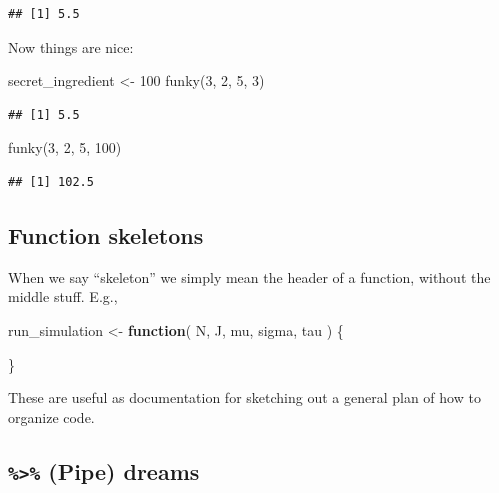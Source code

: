 \documentclass[
]{book}
\newenvironment{Shaded}{\begin{snugshade}}{\end{snugshade}}
\newcommand{\ControlFlowTok}[1]{\textcolor[rgb]{0.13,0.29,0.53}{\textbf{#1}}}
\newcommand{\DecValTok}[1]{\textcolor[rgb]{0.00,0.00,0.81}{#1}}
\newcommand{\FunctionTok}[1]{\textcolor[rgb]{0.00,0.00,0.00}{#1}}
\newcommand{\NormalTok}[1]{#1}
\newcommand{\OtherTok}[1]{\textcolor[rgb]{0.56,0.35,0.01}{#1}}
\begin{document}
\begin{verbatim}
## [1] 5.5
\end{verbatim}

Now things are nice:

\begin{Shaded}
\begin{Highlighting}[]
\NormalTok{secret\_ingredient }\OtherTok{\textless{}{-}} \DecValTok{100}
\FunctionTok{funky}\NormalTok{(}\DecValTok{3}\NormalTok{, }\DecValTok{2}\NormalTok{, }\DecValTok{5}\NormalTok{, }\DecValTok{3}\NormalTok{)}
\end{Highlighting}
\end{Shaded}

\begin{verbatim}
## [1] 5.5
\end{verbatim}

\begin{Shaded}
\begin{Highlighting}[]
\FunctionTok{funky}\NormalTok{(}\DecValTok{3}\NormalTok{, }\DecValTok{2}\NormalTok{, }\DecValTok{5}\NormalTok{, }\DecValTok{100}\NormalTok{)}
\end{Highlighting}
\end{Shaded}

\begin{verbatim}
## [1] 102.5
\end{verbatim}

\hypertarget{function-skeletons}{%
\subsection{Function skeletons}\label{function-skeletons}}

When we say ``skeleton'' we simply mean the header of a function, without the middle stuff. E.g.,

\begin{Shaded}
\begin{Highlighting}[]
\NormalTok{run\_simulation }\OtherTok{\textless{}{-}} \ControlFlowTok{function}\NormalTok{( N, J, mu, sigma, tau ) \{}
  
\NormalTok{\}}
\end{Highlighting}
\end{Shaded}

These are useful as documentation for sketching out a general plan of how to organize code.

\hypertarget{pipe-dreams}{%
\subsection{\texorpdfstring{\texttt{\%\textgreater{}\%} (Pipe) dreams}{\%\textgreater\% (Pipe) dreams}}\label{pipe-dreams}}
\end{document}

